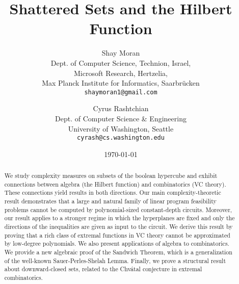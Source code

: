 \documentclass[11pt]{article}
\title{Shattered Sets and the Hilbert Function}
\author{
	Shay Moran
	\\ {\small Dept. of Computer Science, Technion, Israel}, 
	\\ {\small Microsoft Research, Hertzelia,}
	\\ {\small Max Planck Institute for Informatics, Saarbr\"{u}cken} %
	\\ {\small  \texttt{shaymoran1@gmail.com}}
	\and 
	Cyrus Rashtchian
	\\ {\small Dept. of Computer Science \& Engineering}
	\\ {\small University of Washington, Seattle}
	\\ {\small \texttt{cyrash@cs.washington.edu}}
}
\theoremstyle{definition}
\newcommand{\1}{\mathbf{1}}
\begin{document}
\date{\today}
\maketitle




\maketitle

\begin{abstract}
\sloppypar
We study complexity measures on subsets of the boolean hypercube and exhibit connections between algebra (the Hilbert function) and combinatorics (VC theory). These connections yield results in both directions.   Our main complexity-theoretic result demonstrates that a large and natural family of linear program feasibility problems cannot be computed by polynomial-sized constant-depth circuits. Moreover, our result applies to a stronger regime in which the hyperplanes are fixed and only the directions of the inequalities are given as input to the circuit. We derive this result by proving that a rich class of extremal functions in VC theory cannot be approximated by low-degree polynomials. We also present applications of algebra to combinatorics.  We provide a new algebraic proof of the Sandwich Theorem, which is a generalization of the well-known Sauer-Perles-Shelah Lemma. 
Finally, we prove a structural result about downward-closed sets, related to the Chv\'{a}tal  conjecture in extremal combinatorics.  
 \end{abstract}
\end{document}
